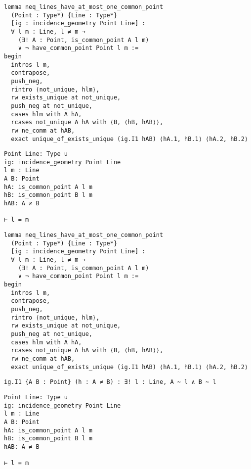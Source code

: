 \begin{frame}[fragile]
	\begin{multicols}{2}
		\begin{lstlisting}
lemma neq_lines_have_at_most_one_common_point 
  (Point : Type*) {Line : Type*} 
  [ig : incidence_geometry Point Line] :
  ∀ l m : Line, l ≠ m → 
    (∃! A : Point, is_common_point A l m) 
    ∨ ¬ have_common_point Point l m := 
begin
  intros l m,
  contrapose,
  push_neg,
  rintro ⟨not_unique, hlm⟩,
  rw exists_unique at not_unique,
  push_neg at not_unique,
  cases hlm with A hA,
  rcases not_unique A hA with ⟨B, ⟨hB, hAB⟩⟩,
  rw ne_comm at hAB,
  exact unique_of_exists_unique (ig.I1 hAB) ⟨hA.1, hB.1⟩ ⟨hA.2, hB.2⟩
\end{lstlisting}
		\columnbreak
		\begin{lstlisting}
Point Line: Type u
ig: incidence_geometry Point Line
l m : Line
A B: Point
hA: is_common_point A l m
hB: is_common_point B l m
hAB: A ≠ B

⊢ l = m
\end{lstlisting}
	\end{multicols}
\end{frame}










\begin{frame}[fragile]
	\begin{multicols}{2}
		\begin{lstlisting}
lemma neq_lines_have_at_most_one_common_point 
  (Point : Type*) {Line : Type*} 
  [ig : incidence_geometry Point Line] :
  ∀ l m : Line, l ≠ m → 
    (∃! A : Point, is_common_point A l m) 
    ∨ ¬ have_common_point Point l m := 
begin
  intros l m,
  contrapose,
  push_neg,
  rintro ⟨not_unique, hlm⟩,
  rw exists_unique at not_unique,
  push_neg at not_unique,
  cases hlm with A hA,
  rcases not_unique A hA with ⟨B, ⟨hB, hAB⟩⟩,
  rw ne_comm at hAB,
  exact unique_of_exists_unique (ig.I1 hAB) ⟨hA.1, hB.1⟩ ⟨hA.2, hB.2⟩
\end{lstlisting}
		\vspace{1em}
		\begin{lstlisting}
ig.I1 {A B : Point} (h : A ≠ B) : ∃! l : Line, A ~ l ∧ B ~ l
\end{lstlisting}
		\columnbreak
		\begin{lstlisting}
Point Line: Type u
ig: incidence_geometry Point Line
l m : Line
A B: Point
hA: is_common_point A l m
hB: is_common_point B l m
hAB: A ≠ B

⊢ l = m
\end{lstlisting}
	\end{multicols}
\end{frame}










